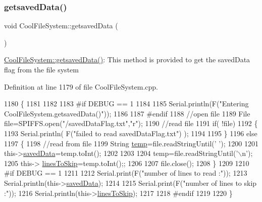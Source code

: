 \subsubsection{\texorpdfstring{getsaved\+Data()}{getsavedData()}}
{\footnotesize\ttfamily void Cool\+File\+System\+::getsaved\+Data (\begin{DoxyParamCaption}{ }\end{DoxyParamCaption})}

\hyperlink{class_cool_file_system_a70701d05e811604af1b531f4f6dc69ed}{Cool\+File\+System\+::getsaved\+Data()}\+: This method is provided to get the saved\+Data flag from the file system 

Definition at line 1179 of file Cool\+File\+System.\+cpp.


\begin{DoxyCode}
1180 \{
1181 
1182 
1183 \textcolor{preprocessor}{#if DEBUG == 1}
1184     
1185     Serial.println(F(\textcolor{stringliteral}{"Entering CoolFileSystem.getsavedData()"}));    
1186     
1187 \textcolor{preprocessor}{#endif}
1188     \textcolor{comment}{//open file}
1189     File file=SPIFFS.open(\textcolor{stringliteral}{"/savedDataFlag.txt"},\textcolor{stringliteral}{"r"});    
1190     \textcolor{comment}{//read file}
1191     \textcolor{keywordflow}{if}( !file)  
1192     \{
1193         Serial.println( F(\textcolor{stringliteral}{"failed to read savedDataFlag.txt"}) );
1194         
1195     \}
1196     \textcolor{keywordflow}{else}
1197     \{       
1198         \textcolor{comment}{//read from file    }
1199         String \hyperlink{_irene3000_8h_a5905d48604152cf57aa6bfa087b49173}{temp}=file.readStringUntil(\textcolor{charliteral}{' '});
1200         
1201         this->\hyperlink{class_cool_file_system_ad9f5b739a32100f5f21270c3d9ee2b1d}{savedData}=temp.toInt();
1202 
1203         
1204         temp=file.readStringUntil(\textcolor{charliteral}{'\(\backslash\)n'});
1205         this-> \hyperlink{class_cool_file_system_a84fdb6057e534b395512463daa28ea3c}{linesToSkip}=temp.toInt();;    
1206         
1207         file.close();   
1208     \}
1209     
1210 \textcolor{preprocessor}{#if DEBUG == 1}
1211 
1212     Serial.print(F(\textcolor{stringliteral}{"number of lines to read :"}));
1213     Serial.println(this->\hyperlink{class_cool_file_system_ad9f5b739a32100f5f21270c3d9ee2b1d}{savedData});
1214     
1215     Serial.print(F(\textcolor{stringliteral}{"number of lines to skip :"}));
1216     Serial.println(this->\hyperlink{class_cool_file_system_a84fdb6057e534b395512463daa28ea3c}{linesToSkip});
1217 
1218 \textcolor{preprocessor}{#endif}
1219     
1220 \}
\end{DoxyCode}
